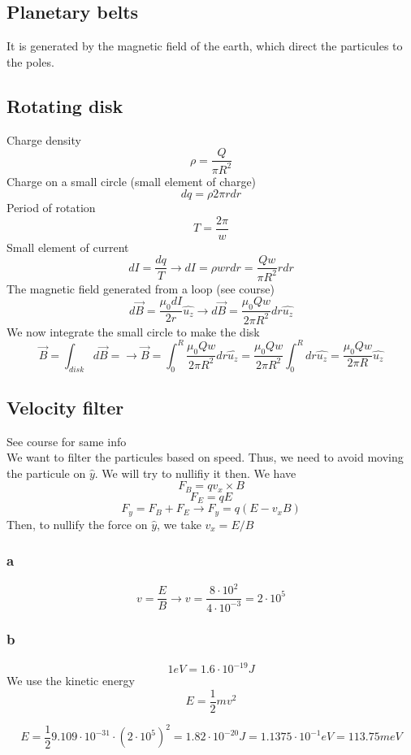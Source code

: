 \subsection{Planetary belts}
It is generated by the magnetic field of the earth, which direct the particules
to the poles.

\subsection{Rotating disk}
Charge density
\[
	\rho = \frac{Q}{\pi R^2}
\]
Charge on a small circle (small element of charge)
\[
	dq = \rho 2 \pi r dr
\]
Period of rotation
\[
	T = \frac{2 \pi}{w}
\]
Small element of current
\[
	dI = \frac{dq}{T}
	\to dI = \rho w r dr = \frac{Q w}{\pi R^2} r dr
\]
The magnetic field generated from a loop (see course)
\[
	d \vec{B} = \frac{\mu_0 dI}{2 r} \hat{u_z}
	\to d \vec{B} = \frac{\mu_0 Q w}{2 \pi R^2} dr \hat{u_z}
\]
We now integrate the small circle to make the disk
\[
	\vec{B} = \int_{disk} d \vec{B} =
	\to \vec{B} = \int_0^R \frac{\mu_0 Q w}{2 \pi R^2} dr \hat{u_z}
	= \frac{\mu_0 Q w}{2 \pi R^2} \int_0^R dr \hat{u_z}
	= \frac{\mu_0 Q w}{2 \pi R} \hat{u_z}
\]

\subsection{Velocity filter}

See course for same info \\
We want to filter the particules based on speed. Thus, we need to avoid moving
the particule on \(\hat{y}\). We will try to nullifiy it then. We have
\[F_B = q v_x \times B\]
\[F_E = q E\]
\[F_y = F_B + F_E \to F_y = q(E - v_x B)\]
Then, to nullify the force on \(\hat{y}\), we take \(v_x = E / B\)

\subsubsection{a}
\[
	v = \frac{E}{B}
	\to v = \frac{8 \cdot 10^2}{4 \cdot 10^{-3}} = 2 \cdot 10^5
\]

\subsubsection{b}
\[1 \unit{eV} = 1.6 \cdot 10^{-19} \unit{J}\]
We use the kinetic energy
\[E = \frac{1}{2} m v^2\]

\[
	E = \frac{1}{2} 9.109 \cdot 10^{-31} \cdot (2 \cdot 10^5)^2
	= 1.82 \cdot 10^{-20} \unit{J}
	= 1.1375 \cdot 10^{-1} \unit{eV}
	= 113.75 \unit{meV}
\]

